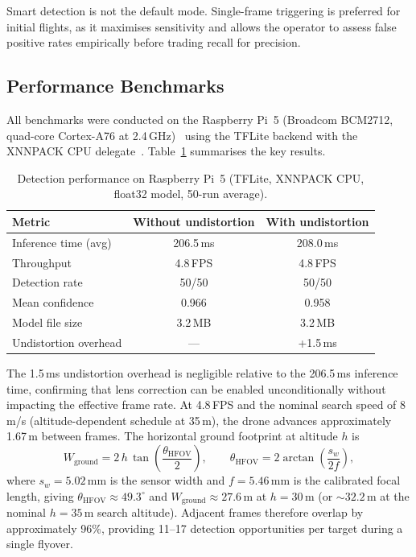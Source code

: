 Smart detection is not the default mode. Single-frame triggering is preferred for initial flights, as it maximises sensitivity and allows the operator to assess false positive rates empirically before trading recall for precision.

\subsection{Performance Benchmarks}\label{sec:cv:benchmarks}

All benchmarks were conducted on the Raspberry Pi~5 (Broadcom BCM2712, quad-core Cortex-A76 at 2.4\,GHz)~\cite{raspberrypi5} using the TFLite backend with the XNNPACK CPU delegate~\cite{xnnpack}. Table~\ref{tab:cv_benchmarks} summarises the key results.

\begin{table}[ht]
    \centering
    \caption{Detection performance on Raspberry Pi~5 (TFLite, XNNPACK CPU, float32 model, 50-run average).}
    \label{tab:cv_benchmarks}
    \begin{tabular}{lcc}
        \toprule
        \textbf{Metric} & \textbf{Without undistortion} & \textbf{With undistortion} \\
        \midrule
        Inference time (avg)    & 206.5\,ms  & 208.0\,ms  \\
        Throughput              & 4.8\,FPS   & 4.8\,FPS   \\
        Detection rate          & 50/50      & 50/50      \\
        Mean confidence         & 0.966      & 0.958      \\
        Model file size         & 3.2\,MB    & 3.2\,MB    \\
        Undistortion overhead   & ---        & +1.5\,ms   \\
        \bottomrule
    \end{tabular}
\end{table}

The 1.5\,ms undistortion overhead is negligible relative to the 206.5\,ms inference time, confirming that lens correction can be enabled unconditionally without impacting the effective frame rate. At 4.8\,FPS and the nominal search speed of 8\,m/s (altitude-dependent schedule at 35\,m), the drone advances approximately 1.67\,m between frames. The horizontal ground footprint at altitude $h$ is
\begin{equation}\label{eq:fov_footprint}
    W_{\text{ground}} = 2\,h\,\tan\!\left(\frac{\theta_{\text{HFOV}}}{2}\right),
    \qquad
    \theta_{\text{HFOV}} = 2\arctan\!\left(\frac{s_w}{2f}\right),
\end{equation}
where $s_w = 5.02$\,mm is the sensor width and $f = 5.46$\,mm is the calibrated focal length, giving $\theta_{\text{HFOV}} \approx 49.3^{\circ}$ and $W_{\text{ground}} \approx 27.6$\,m at $h=30$\,m (or ${\sim}32.2$\,m at the nominal $h=35$\,m search altitude). Adjacent frames therefore overlap by approximately 96\%, providing 11--17 detection opportunities per target during a single flyover.

